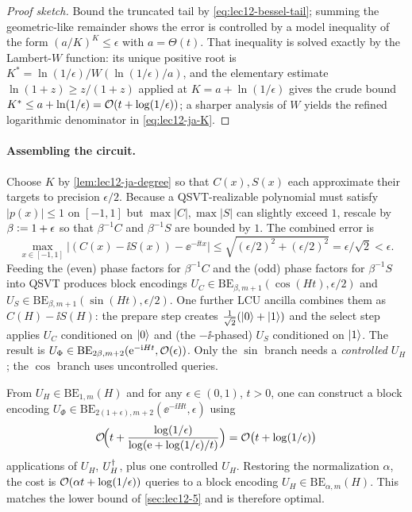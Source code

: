 \begin{proof}[Proof sketch]
Bound the truncated tail by \eqref{eq:lec12-bessel-tail}; summing the geometric-like
remainder shows the error is controlled by a model inequality of the form
$(a/K)^K\le\epsilon$ with $a=\Theta(t)$. That inequality is solved exactly by the
Lambert-$W$ function: its unique positive root is $K^\ast=\ln(1/\epsilon)/W(\ln(1/\epsilon)/a)$,
and the elementary estimate $\ln(1+z)\ge z/(1+z)$ applied at $K=a+\ln(1/\epsilon)$ gives the
crude bound $K^\ast\le a+\ln(1/\epsilon)=\mathcal{O}(t+\log(1/\epsilon))$; a sharper analysis of
$W$ yields the refined logarithmic denominator in \eqref{eq:lec12-ja-K}.
\end{proof}

\paragraph{Assembling the circuit.}
Choose $K$ by \cref{lem:lec12-ja-degree} so that $C(x),S(x)$ each approximate their
targets to precision $\epsilon/2$. Because a QSVT-realizable polynomial must satisfy
$|p(x)|\le1$ on $[-1,1]$ but $\max|C|,\max|S|$ can slightly exceed $1$, rescale by
$\beta\vcentcolon=1+\epsilon$ so that $\beta^{-1}C$ and $\beta^{-1}S$ are bounded by $1$. The
combined error is
\begin{equation}
  \max_{x\in[-1,1]}\bigl|(C(x)-\ii S(x))-\ee^{-\ii tx}\bigr|
  \le\sqrt{(\epsilon/2)^2+(\epsilon/2)^2}=\epsilon/\sqrt2<\epsilon.
  \label{eq:lec12-cs-error}
\end{equation}
Feeding the (even) phase factors for $\beta^{-1}C$ and the (odd) phase factors for
$\beta^{-1}S$ into QSVT produces block encodings
$U_C\in\mathrm{BE}_{\beta,m+1}(\cos(Ht),\epsilon/2)$ and
$U_S\in\mathrm{BE}_{\beta,m+1}(\sin(Ht),\epsilon/2)$. One further LCU ancilla combines them
as $C(H)-\ii S(H)$: the prepare step creates $\tfrac1{\sqrt2}(\ket0+\ket1)$ and the select
step applies $U_C$ conditioned on $\ket0$ and (the $-\ii$-phased) $U_S$ conditioned on
$\ket1$. The result is $U_\Phi\in\mathrm{BE}_{2\beta,m+2}(\mathrm{e}^{-\mathrm{i} Ht},\mathcal{O}(\epsilon))$.
Only the $\sin$ branch needs a \emph{controlled} $U_H$; the $\cos$ branch uses uncontrolled
queries.

\begin{theorem}
\label{thm:lec12-optimal}
From $U_H\in\mathrm{BE}_{1,m}(H)$ and for any $\epsilon\in(0,1)$, $t>0$, one can construct
a block encoding $U_\Phi\in\mathrm{BE}_{2(1+\epsilon),m+2}(\ee^{-\ii Ht},\epsilon)$ using
\begin{equation}
  \mathcal{O}\!\Bigl(t+\frac{\log(1/\epsilon)}{\log(\mathrm{e}+\log(1/\epsilon)/t)}\Bigr)
  =\mathcal{O}\bigl(t+\log(1/\epsilon)\bigr)
  \label{eq:lec12-thm-cost}
\end{equation}
applications of $U_H$, $U_H^{\dagger}$, plus one controlled $U_H$. Restoring the normalization
$\alpha$, the cost is $\mathcal{O}(\alpha t+\log(1/\epsilon))$ queries to a block encoding
$U_H\in\mathrm{BE}_{\alpha,m}(H)$. This matches the lower bound of \cref{sec:lec12-5} and
is therefore optimal.
\end{theorem}

